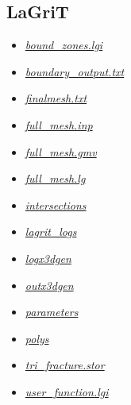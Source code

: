 \documentclass[letterpaper,10pt,english]{sphinxmanual}
\begin{document}
\subsection{LaGriT}
\label{output:lagrit}\begin{itemize}
\item {} 
{\hyperref[output:bound-zones-lgi]{\emph{bound\_zones.lgi}}}

\item {} 
{\hyperref[output:boundary-output-txt]{\emph{boundary\_output.txt}}}

\item {} 
{\hyperref[output:finalmesh-txt]{\emph{finalmesh.txt}}}

\item {} 
{\hyperref[output:full-mesh-inp]{\emph{full\_mesh.inp}}}

\item {} 
{\hyperref[output:full-mesh-gmv]{\emph{full\_mesh.gmv}}}

\item {} 
{\hyperref[output:full-mesh-lg]{\emph{full\_mesh.lg}}}

\item {} 
{\hyperref[output:intersections]{\emph{intersections}}}

\item {} 
{\hyperref[output:lagrit-logs]{\emph{lagrit\_logs}}}

\item {} 
{\hyperref[output:logx3dgen]{\emph{logx3dgen}}}

\item {} 
{\hyperref[output:outx3dgen]{\emph{outx3dgen}}}

\item {} 
{\hyperref[output:parameters]{\emph{parameters}}}

\item {} 
{\hyperref[output:polys]{\emph{polys}}}

\item {} 
{\hyperref[output:tri-fracture-stor]{\emph{tri\_fracture.stor}}}

\item {} 
{\hyperref[output:user-function-lgi]{\emph{user\_function.lgi}}}

\end{itemize}
\end{document}
